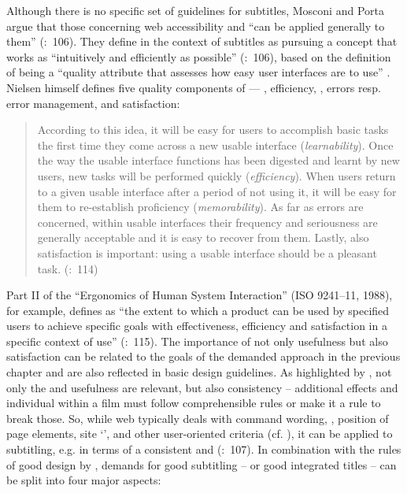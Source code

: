 Although there is no specific set of  guidelines for subtitles, Mosconi and Porta argue that those concerning web accessibility and  “can be applied generally to them” (\citeyear{mosconi2012}:~106). They define  in the context of subtitles as pursuing a concept that works as “intuitively and efficiently as possible” (\citeyear{mosconi2012}:~106), based on the definition of  being a “quality attribute that assesses how easy user interfaces are to use” \citep{nielsen2003}. Nielsen himself defines five quality components of  — , efficiency, , errors resp. error management, and satisfaction:
\begin{quote}
According to this idea, it will be easy for users to accomplish basic tasks the first time they come across a new usable interface (\textit{learnability}). Once the way the usable interface functions has been digested and learnt by new users, new tasks will be performed quickly (\textit{efficiency}). When users return to a given usable interface after a period of not using it, it will be easy for them to re-establish proficiency (\textit{memorability}). As far as errors are concerned, within usable interfaces their frequency and seriousness are generally acceptable and it is easy to recover from them. Lastly, also satisfaction is important: using a usable interface should be a pleasant task. (\citeyear{mosconi2012}:~114)
\end{quote}
Part II of the “Ergonomics of Human System Interaction” (ISO 9241--11, 1988), for example, defines  as “the extent to which a product can be used by specified users to achieve specific goals with effectiveness, efficiency and satisfaction in a specific context of use” (\citealt{mosconi2012}:~115). The importance of not only usefulness but also satisfaction can be related to the goals of the demanded  approach in the previous chapter and are also reflected in basic design guidelines. As highlighted by \citet{Foerster2010}, not only the  and usefulness are relevant, but also consistency – additional effects and individual  within a film must follow comprehensible rules or make it a rule to break those. So, while web  typically deals with command wording, , position of page elements, site ‘’, and other user-oriented criteria (cf. \citealt{Cherim2007}), it can be applied to subtitling, e.g. in terms of a consistent  and  (\citealt{mosconi2012}:~107). In combination with the rules of good design by \citet{shneiderman1998}, demands for good subtitling – or good integrated titles – can be split into four major aspects:

